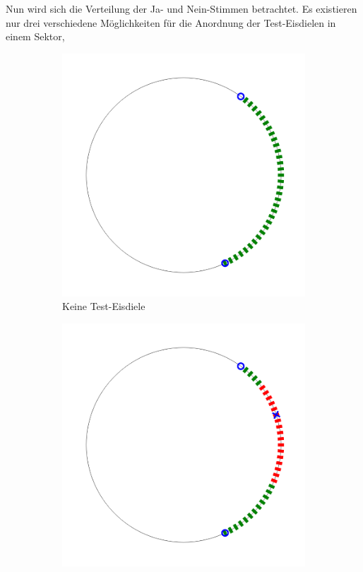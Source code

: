 \documentclass[a4paper,10pt,ngerman]{scrartcl}
\newcommand{\imageWidth}{0.3\linewidth}
\begin{document}
\medskip
Nun wird sich die Verteilung der Ja- und Nein-Stimmen betrachtet.
Es existieren nur drei verschiedene Möglichkeiten für die Anordnung der Test-Eisdielen in einem Sektor,
\begin{figure}[ht]
    \centering
    \caption{Test-Eisdielen Anordnung im Sektor}
    \begin{subfigure}[t]{\imageWidth}
        \includegraphics[width=\linewidth]{06_no_test_ice.png}
        \caption{Keine Test-Eisdiele}
        \label{fig:06_no_test_ice}
    \end{subfigure}
    \begin{subfigure}[t]{\imageWidth}
        \includegraphics[width=\linewidth]{07_one_test_ice.png}

\end{subfigure}
\end{figure}
\end{document}
